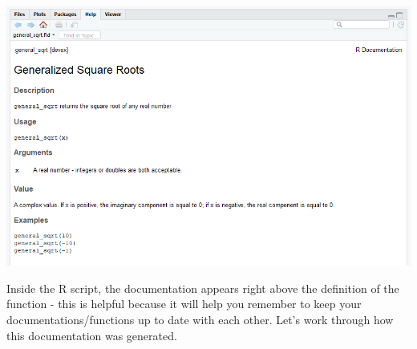 \documentclass[
]{book}
\begin{document}
\includegraphics{images/packageSS/gensqrtdoc.PNG}

Inside the R script, the documentation appears right above the definition of the function - this is helpful because it will help you remember to keep your documentations/functions up to date with each other. Let's work through how this documentation was generated.
\end{document}
